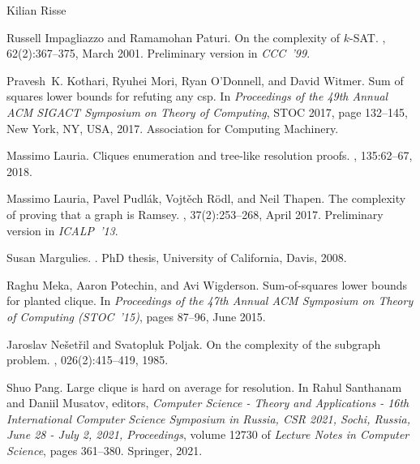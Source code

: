 \documentclass[report]{owrart}
\begin{document}
\begin{report}
\begin{talk}{Kilian Risse}
\begin{thebibliography}{99}
      Russell Impagliazzo and Ramamohan Paturi.
      \newblock On the complexity of \mbox{$k$-{SAT}}.
      , 62(2):367--375, March
        2001.
      \newblock Preliminary version in \emph{CCC~'99}.
      
      Pravesh~K. Kothari, Ryuhei Mori, Ryan O’Donnell, and David Witmer.
      \newblock Sum of squares lower bounds for refuting any csp.
      \newblock In {\em Proceedings of the 49th Annual ACM SIGACT Symposium on Theory
        of Computing}, STOC 2017, page 132–145, New York, NY, USA, 2017.
        Association for Computing Machinery.
      
      Massimo Lauria.
      \newblock Cliques enumeration and tree-like resolution proofs.
      , 135:62--67, 2018.
      
      Massimo Lauria, Pavel Pudl\'{a}k, Vojt\v{e}ch R\"{o}dl, and Neil Thapen.
      \newblock The complexity of proving that a graph is {R}amsey.
      , 37(2):253--268, April 2017.
      \newblock Preliminary version in \emph{ICALP~'13}.
      
      Susan Margulies.
      .
      \newblock PhD thesis, University of California, Davis, 2008.
      
      Raghu Meka, Aaron Potechin, and Avi Wigderson.
      \newblock Sum-of-squares lower bounds for planted clique.
      \newblock In {\em Proceedings of the 47th Annual ACM Symposium on Theory of
        Computing ({STOC}~'15)}, pages 87--96, June 2015.
      
      Jaroslav Ne\v{s}et\v{r}il and Svatopluk Poljak.
      \newblock On the complexity of the subgraph problem.
      ,
        026(2):415--419, 1985.
      
      Shuo Pang.
      \newblock Large clique is hard on average for resolution.
      \newblock In Rahul Santhanam and Daniil Musatov, editors, {\em Computer Science
        - Theory and Applications - 16th International Computer Science Symposium in
        Russia, {CSR} 2021, Sochi, Russia, June 28 - July 2, 2021, Proceedings},
        volume 12730 of {\em Lecture Notes in Computer Science}, pages 361--380.
        Springer, 2021.
      

\end{thebibliography}
\end{talk}
\end{report}
\end{document}
